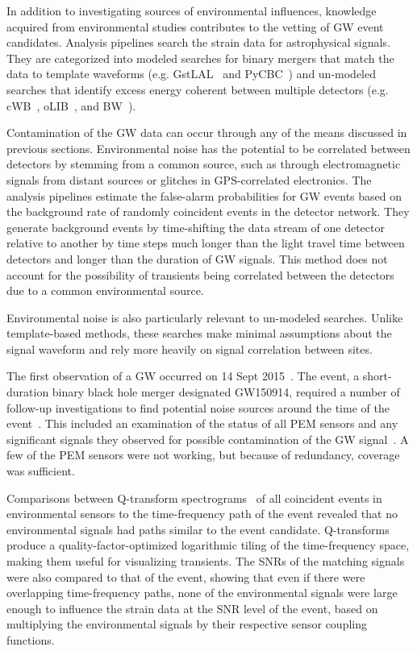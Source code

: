 In addition to investigating sources of environmental influences, knowledge acquired from environmental studies contributes to the vetting of \ac{GW} event candidates.
Analysis pipelines search the strain data for astrophysical signals.
They are categorized into modeled searches for binary mergers that match the data to template waveforms (e.g. GstLAL~\citep{Cannon_2012} and PyCBC~\citep{Usman_2016}) and un-modeled searches that identify excess energy coherent between multiple detectors (e.g. cWB~\citep{Klimenko_2008}, oLIB~\citep{Lynch_2017}, and BW~\citep{Cornish_2015}).

Contamination of the \ac{GW} data can occur through any of the means discussed in previous sections.
Environmental noise has the potential to be correlated between detectors by stemming from a common source, such as through electromagnetic signals from distant sources or glitches in GPS-correlated electronics.
The analysis pipelines estimate the false-alarm probabilities for GW events based on the background rate of randomly coincident events in the detector network.
They generate background events by time-shifting the data stream of one detector relative to another by time steps much longer than the light travel time between detectors and longer than the duration of GW signals.%
This method does not account for the possibility of transients being correlated between the detectors due to a common environmental source.

Environmental noise is also particularly relevant to un-modeled searches. Unlike template-based methods, these searches make minimal assumptions about the signal waveform and rely more heavily on signal correlation between sites.

The first observation of a \ac{GW} occurred on 14 Sept 2015~\citep{gw150914}.
The event, a short-duration binary black hole merger designated GW150914, required a number of follow-up investigations to find potential noise sources around the time of the event~\citep{Detchar_2016}.
This included an examination of the status of all \ac{PEM} sensors and any significant signals they observed for possible contamination of the GW signal~\citep{Schofield_150914}.
A few of the \ac{PEM} sensors were not working, but because of redundancy, coverage was sufficient. 

Comparisons between Q-transform spectrograms~\citep{Chatterji_2004} of all coincident events in environmental sensors to the time-frequency path of the event revealed that no environmental signals had paths similar to the event candidate.
Q-transforms produce a quality-factor-optimized logarithmic tiling of the time-frequency space, making them useful for visualizing transients.
The \acp{SNR} of the matching signals were also compared to that of the event, showing that even if there were overlapping time-frequency paths, none of the environmental signals were large enough to influence the strain data at the \ac{SNR} level of the event, based on multiplying the environmental signals by their respective sensor coupling functions.

